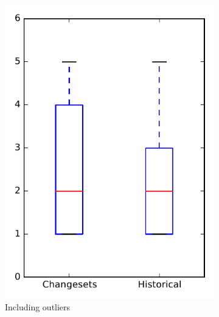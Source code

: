 
\begin{figure}
    \centering
    \begin{subfigure}{.4\textwidth}
        \centering
        \includegraphics[height=0.4\textheight]{figures/dit/rq2_bookkeeper}
        \caption{Including outliers}\label{fig:dit:rq2:bookkeeper_outlier}
    \end{subfigure}%
    \begin{subfigure}{.4\textwidth}
        \centering

\end{subfigure}
\end{figure}
